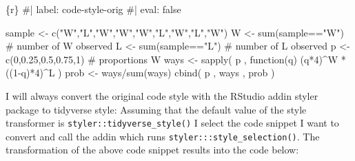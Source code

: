 \documentclass[
  letterpaper,
  DIV=11,
  numbers=noendperiod]{scrreprt}
\newenvironment{Shaded}{\begin{snugshade}}{\end{snugshade}}
\newcommand{\CommentTok}[1]{\textcolor[rgb]{0.37,0.37,0.37}{#1}}
\newcommand{\ControlFlowTok}[1]{\textcolor[rgb]{0.00,0.23,0.31}{#1}}
\newcommand{\DecValTok}[1]{\textcolor[rgb]{0.68,0.00,0.00}{#1}}
\newcommand{\FloatTok}[1]{\textcolor[rgb]{0.68,0.00,0.00}{#1}}
\newcommand{\FunctionTok}[1]{\textcolor[rgb]{0.28,0.35,0.67}{#1}}
\newcommand{\InformationTok}[1]{\textcolor[rgb]{0.37,0.37,0.37}{#1}}
\newcommand{\NormalTok}[1]{\textcolor[rgb]{0.00,0.23,0.31}{#1}}
\newcommand{\OtherTok}[1]{\textcolor[rgb]{0.00,0.23,0.31}{#1}}
\newcommand{\SpecialCharTok}[1]{\textcolor[rgb]{0.37,0.37,0.37}{#1}}
\newcommand{\StringTok}[1]{\textcolor[rgb]{0.13,0.47,0.30}{#1}}
\begin{document}
\begin{Shaded}
\begin{Highlighting}[]
\InformationTok{\textasciigrave{}\textasciigrave{}\textasciigrave{}\{r\}}
\CommentTok{\#| label: code{-}style{-}orig}
\CommentTok{\#| eval: false}

\NormalTok{sample }\OtherTok{\textless{}{-}} \FunctionTok{c}\NormalTok{(}\StringTok{"W"}\NormalTok{,}\StringTok{"L"}\NormalTok{,}\StringTok{"W"}\NormalTok{,}\StringTok{"W"}\NormalTok{,}\StringTok{"W"}\NormalTok{,}\StringTok{"L"}\NormalTok{,}\StringTok{"W"}\NormalTok{,}\StringTok{"L"}\NormalTok{,}\StringTok{"W"}\NormalTok{)}
\NormalTok{W }\OtherTok{\textless{}{-}} \FunctionTok{sum}\NormalTok{(sample}\SpecialCharTok{==}\StringTok{"W"}\NormalTok{) }\CommentTok{\# number of W observed}
\NormalTok{L }\OtherTok{\textless{}{-}} \FunctionTok{sum}\NormalTok{(sample}\SpecialCharTok{==}\StringTok{"L"}\NormalTok{) }\CommentTok{\# number of L observed}
\NormalTok{p }\OtherTok{\textless{}{-}} \FunctionTok{c}\NormalTok{(}\DecValTok{0}\NormalTok{,}\FloatTok{0.25}\NormalTok{,}\FloatTok{0.5}\NormalTok{,}\FloatTok{0.75}\NormalTok{,}\DecValTok{1}\NormalTok{) }\CommentTok{\# proportions W}
\NormalTok{ways }\OtherTok{\textless{}{-}} \FunctionTok{sapply}\NormalTok{( p , }\ControlFlowTok{function}\NormalTok{(q) (q}\SpecialCharTok{*}\DecValTok{4}\NormalTok{)}\SpecialCharTok{\^{}}\NormalTok{W }\SpecialCharTok{*}\NormalTok{ ((}\DecValTok{1}\SpecialCharTok{{-}}\NormalTok{q)}\SpecialCharTok{*}\DecValTok{4}\NormalTok{)}\SpecialCharTok{\^{}}\NormalTok{L )}
\NormalTok{prob }\OtherTok{\textless{}{-}}\NormalTok{ ways}\SpecialCharTok{/}\FunctionTok{sum}\NormalTok{(ways)}
\FunctionTok{cbind}\NormalTok{( p , ways , prob )}

\InformationTok{\textasciigrave{}\textasciigrave{}\textasciigrave{}}
\end{Highlighting}
\end{Shaded}

I will always convert the original code style with the RStudio addin
styler package to tidyverse style: Assuming that the default value of
the style transformer is \texttt{styler::tidyverse\_style()} I select
the code snippet I want to convert and call the addin which runs
\texttt{styler:::style\_selection()}. The transformation of the above
code snippet results into the code below:
\end{document}
